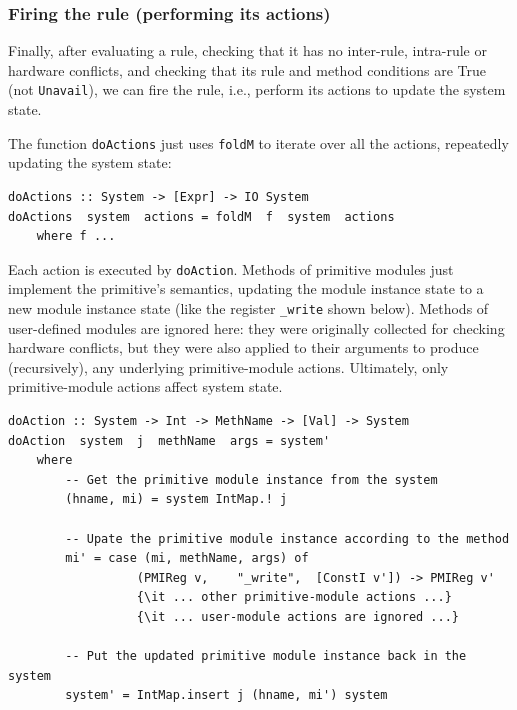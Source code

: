 \documentclass[11pt]{article}
\newcommand{\term}[1]{\texttt{#1}}
\begin{document}

\subsubsection{Firing the rule (performing its actions)}

Finally, after evaluating a rule, checking that it has no inter-rule,
intra-rule or hardware conflicts, and checking that its rule and
method conditions are True (not \term{Unavail}), we can fire the rule,
i.e., perform its actions to update the system state.

The function \term{doActions} just uses \term{foldM} to iterate over
all the actions, repeatedly updating the system state:

\begin{Verbatim}[frame=single, commandchars=\\\{\}]
doActions :: System -> [Expr] -> IO System
doActions  system  actions = foldM  f  system  actions
    where f ...
\end{Verbatim}

Each action is executed by \term{doAction}.  Methods of primitive
modules just implement the primitive's semantics, updating the module
instance state to a new module instance state (like the register
\verb|_write| shown below).  Methods of user-defined modules are
ignored here: they were originally collected for checking hardware
conflicts, but they were also applied to their arguments to produce
(recursively), any underlying primitive-module actions.  Ultimately,
only primitive-module actions affect system state.

\begin{Verbatim}[frame=single, commandchars=\\\{\}]
doAction :: System -> Int -> MethName -> [Val] -> System
doAction  system  j  methName  args = system'
    where
        -- Get the primitive module instance from the system
        (hname, mi) = system IntMap.! j

        -- Upate the primitive module instance according to the method
        mi' = case (mi, methName, args) of
                  (PMIReg v,    "_write",  [ConstI v']) -> PMIReg v'
                  {\it ... other primitive-module actions ...}
                  {\it ... user-module actions are ignored ...}

        -- Put the updated primitive module instance back in the system
        system' = IntMap.insert j (hname, mi') system
\end{Verbatim}
\end{document}
